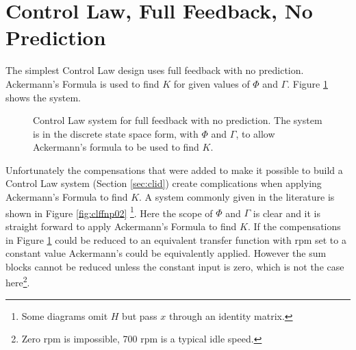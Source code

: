 \documentclass{article}
\begin{document}

\clearpage
\section{Control Law, Full Feedback, No Prediction}
\label{sec:clffnp}

The simplest Control Law\autocite[Pg. 280]{franklin1998digital} design
uses full feedback with no prediction.
Ackermann's Formula is used to find $K$ for given values
of $\Phi$ and $\Gamma$.
Figure \ref{fig:clffnp01} shows the system.

\begin{figure}[!htp]
\begin{center}


\end{center}

\caption{Control Law system for full feedback with no prediction.
The system is in the discrete state space form,
with $\Phi$ and $\Gamma$, to allow Ackermann's formula to be
used to find $K$.}
\label{fig:clffnp01}
\end{figure}

Unfortunately the compensations that were added to make it possible
to build a Control Law system (Section \ref{sec:clid}) create
complications when applying Ackermann's Formula to find $K$.
A system commonly given in the literature is
shown in Figure \ref{fig:clffnp02}
\footnote{Some diagrams omit $H$ but pass $x$ through an identity matrix.}.
Here the scope of $\Phi$ and $\Gamma$ is clear and it is
straight forward to apply Ackermann's Formula to find $K$.
If the compensations in Figure \ref{fig:clffnp01} could be reduced
to an equivalent transfer function with rpm set to a constant value
Ackermann's could be equivalently applied.
However the sum blocks cannot be reduced unless the constant input
is zero, which is not the case here\footnote{Zero rpm is impossible, 700 rpm
is a typical idle speed.}.
\end{document}
